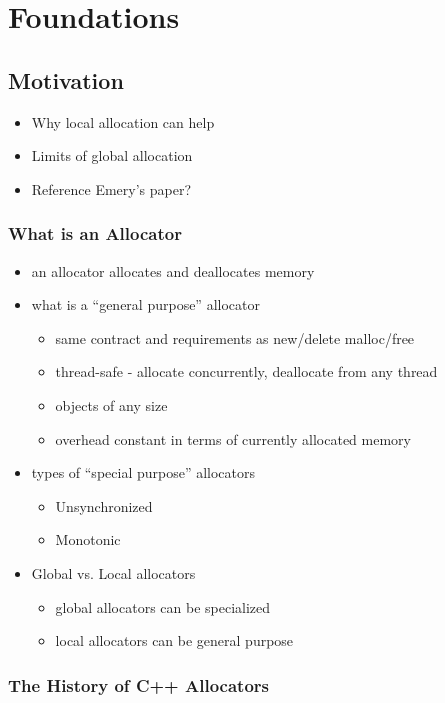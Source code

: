 \chapter{Foundations}

\section{Motivation}

\begin{itemize}
\item Why local allocation can help
\item Limits of global allocation
\item Reference Emery's paper?
\end{itemize}

\subsection{What is an Allocator}
\begin{itemize}
\item an allocator allocates and deallocates memory
\item what is a ``general purpose'' allocator
  \begin{itemize}
  \item same contract and requirements as new/delete malloc/free
  \item thread-safe - allocate concurrently, deallocate from any thread
  \item objects of any size
  \item overhead constant in terms of currently allocated memory
  \end{itemize}
\item types of ``special purpose'' allocators
  \begin{itemize}
  \item Unsynchronized
  \item Monotonic
  \end{itemize}
\item Global vs. Local allocators
  \begin{itemize}
  \item global allocators can be specialized
  \item local allocators can be general purpose
  \end{itemize}
\end{itemize}


\subsection{The History of C++ Allocators}

